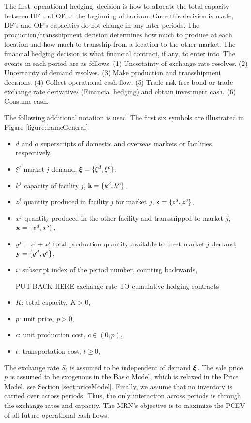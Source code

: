 \documentclass[mnsc,nonblindrev,copyedit]{informs2_wz} %
\newcommand{\xiv}{\mbox{\boldmath$\xi$}}
\begin{document}
The first, operational hedging, decision is how to allocate the total capacity between DF and OF at the beginning of horizon.  Once this decision is made, DF's and OF's capacities do not change in any later periods. The production/transshipment decision determines how much to produce at each location and how much to transship from a location to the other market. The financial hedging decision is what financial contract, if any, to enter into. The events in each period are as follows. (1) Uncertainty of exchange rate resolves. (2) Uncertainty of demand resolves. (3) Make production and transshipment decisions. (4) Collect operational cash flow. (5) Trade risk-free bond or trade exchange rate derivatives (Financial hedging) and obtain investment cash. (6) Consume cash.

The following additional notation is used.  The first six symbols are illustrated in Figure \ref{figure:frameGeneral}.
\begin{itemize}
    \item $d$ and $o$ superscripts of domestic and overseas markets or facilities, respectively,
    \item $\xi^j$ market $j$ demand, ${\xiv} = \{\xi^d, \xi^o \} $,
    \item $k^j$ capacity of facility $j$,   $\bold k = \{k^d,k^o\}$,
    \item $z^{j}$ quantity produced in facility $j$ for market $j$, $\bold z = \{z^{d},z^o\}$,
    \item $x^{j}$ quantity produced in the other facility and transshipped to market $j$, $\bold x = \{x^d,x^o\}$,
    \item $y^{j}= z^j + x^j$ total production quantity available to meet market $j$ demand, $\bold y = \{y^d,y^o\}$,
    \item $i$:  subscript index of the period number, counting backwards,


PUT BACK HERE exchange rate TO cumulative hedging contracts

    \item $K$: total capacity, $K >0$,
    \item $p$: unit price, $p > 0$,
    \item $c$: unit production cost, $c \in (0, p)$,
    \item $t$: transportation cost, $t\geq 0$,
\end{itemize}
The exchange rate $S_i$ is assumed to be independent of demand $\xiv$. The sale price $p$ is assumed to be exogenous in the Basic Model, which is relaxed in the Price Model, see Section \ref{sect:priceModel}. Finally, we assume that no inventory is carried over across periods.  Thus, the only interaction across periods is through the exchange rates and capacity. The MRN's objective is to maximize the PCEV of all future operational cash flows.
\end{document}
